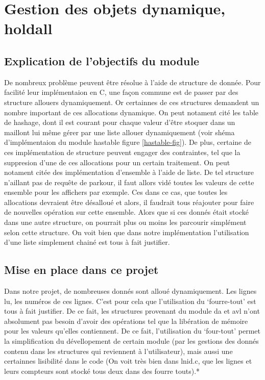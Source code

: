 \documentclass[12pt]{article}
\begin{document}
    \newpage

    \section{Gestion des objets dynamique, holdall}\label{holdall}

    \subsection{Explication de l'objectifs du module}
    
    De nombreux problème peuvent être résolue à l'aide de structure de donnée. 
    Pour facilité leur implémentaion en C, une façon commune est de passer par 
    des structure allouers dynamiquement. Or certainnes de ces structures 
    demandent un nombre important de ces allocations dynamique. On peut notament
    cité les table de hashage, dont il est courant pour chaque valeur d'être 
    stoquer dans un maillont lui même gérer par une liste allouer dynamiquement 
    (voir shéma d'implémentaion du module hastable figure \ref{hastable-fig}). 
    De plus, certaine de ces implémentation de structure peuvent engager des 
    contraintes, tel que la suppresion d'une de ces allocations pour un certain
    traitement. On peut notament citée des implémentation d'ensemble à l'aide de 
    liste. De tel structure n'aillant pas de requête de parkour, il faut allors 
    vidé toutes les valeurs de cette ensemble pour les affichers par exemple. 
    Ces dans ce cas, que toutes les allocations devraient être désalloué et 
    alors, il  faudrait tous réajouter pour faire de nouvelles opération sur 
    cette ensemble. Alors que si ces donnés était stocké dans une autre 
    structure, on pourrait plus ou moins les parcourir simplément selon cette 
    structure. On voit bien que dans notre implémentation l'utilisation d'une 
    liste simplement chainé est tous à fait justifier.

    \subsection{Mise en place dans ce projet}

    Dans notre projet, de nombreuses donnés sont alloué dynamiquement. Les 
    lignes lu, les numéros de ces lignes. C'est pour cela que l'utilisation du 
    `fourre-tout' est tous à fait justifier. De ce fait, les structures 
    provenant du module da et avl n'ont absolument pas besoin d'avoir des
    opérations tel que la libération de mémoire pour les valeurs qu'elles 
    contiennent. De ce fait, l'utilisation du `four-tout' permet la 
    simplification du dévellopement de certain module (par les gestions des 
    donnés contenu dans les structures qui reviennent à l'utilisateur), mais 
    aussi une certainnes lisibilité dans le code (On voit très bien dans lnid.c,
    que les lignes et leurs compteurs sont stocké tous deux dans des fourre 
    touts).*
\end{document}
